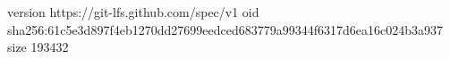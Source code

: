 version https://git-lfs.github.com/spec/v1
oid sha256:61c5e3d897f4eb1270dd27699eedced683779a99344f6317d6ea16c024b3a937
size 193432
